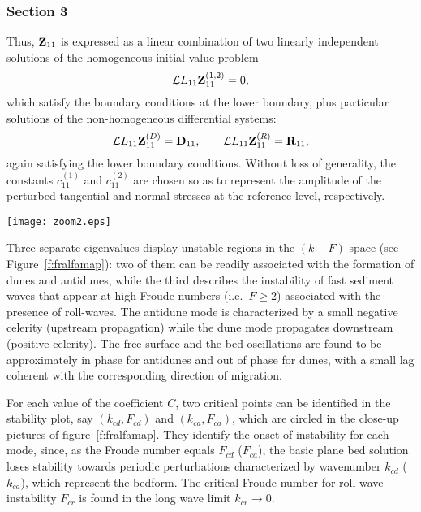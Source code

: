 \documentclass[12pt,a4paper,twocolumn,fleqn]{narms}
\begin{document}
\subsubsection{Section 3}
Thus, $\hbox{\bf Z}_{11}$ is expressed as a linear
combination of two linearly independent solutions of the
homogeneous initial value problem
\begin{equation}
\hbox{${\pcal L}$}{L}_{11} \hbox{\bf Z}_{11}^{(1,2)} = 0,
\label{hom}
\end{equation}
which satisfy the boundary conditions at the lower boundary, plus
particular solutions of the non-homogeneous differential systems:
\begin{equation}
\hbox{${\pcal L}$}{L}_{11} \hbox{\bf Z}_{11}^{(D)} = \hbox{\bf
D}_{11}, \qquad \hbox{${\pcal L}$}{L}_{11} \hbox{\bf Z}_{11}^{(R)}
= \hbox{\bf R}_{11},\label{reyn}
\end{equation}
again satisfying the lower boundary conditions. Without loss of
generality, the constants  $c_{11}^{(1)}$ and $c_{11}^{(2)}$ are
chosen so as to represent the amplitude of the perturbed
tangential and normal stresses at the reference level, respectively.


\begin{figure*}
\centerline{\texttt{[image: zoom2.eps]}}
\caption{Regions of instability for dunes, antidunes and roll
waves; $C=20$, $f=0.02$. The dashed lines in the close-up pictures
correspond to the lines of maximum growth rate.}
\label{f:fralfamap}
\end{figure*}

Three separate eigenvalues display unstable regions in the $(k-F)$
space (see Figure~\ref{f:fralfamap}): two of them can be readily
associated with the formation of dunes and antidunes, while the
third describes the instability of fast sediment waves that appear
at high Froude numbers (i.e.\  $F \geq 2$) associated with the
presence of roll-waves. The antidune mode is characterized by a
small negative celerity (upstream propagation) while the dune mode
propagates downstream (positive celerity). The free surface and
the bed oscillations are found to be approximately in phase for
antidunes and out of phase for dunes, with a small lag coherent
with the corresponding direction of migration.

For each value of the coefficient $C$, two critical points can be
identified in the stability plot, say $(k_{cd}, F_{cd})$ and $(k_{ca},
F_{ca})$, which are circled in the close-up pictures of
figure~\ref{f:fralfamap}. They identify the onset of instability for
each mode, since, as the Froude number equals $F_{cd}$ ($F_{ca}$), the
basic plane bed solution loses stability towards periodic perturbations
characterized by wavenumber $k_{cd}$ ($k_{ca}$), which represent the
bedform. The critical Froude number for roll-wave instability
$F_{cr}$ is found in the long wave limit $k_{cr} \rightarrow 0 $.
\end{document}
